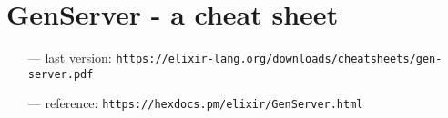 \documentclass[a4paper]{article}
\begin{document}
\section*{GenServer - a cheat sheet}
\begin{itemize}
  \setlength\itemsep{0em}
\item[---] last version: \verb|https://elixir-lang.org/downloads/cheatsheets/gen-server.pdf|
\item[---] reference: \verb|https://hexdocs.pm/elixir/GenServer.html|
\end{itemize}
\begin{comment}
  copyright 2019 by Mario Frasca et al.

  based on a work by Benjamin Tan Wei Hao,
  rewritten as a tex/tikz document by Mario Frasca,
  with José Valim validating the content.
\end{comment}
\end{document}
